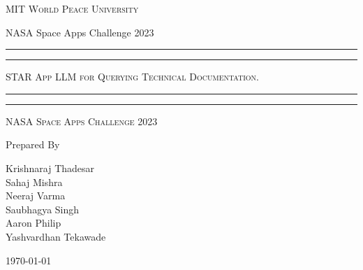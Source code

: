 \documentclass[11pt]{article}
\begin{document}
\begin{titlepage}
	\centering


	\huge\textsc{
		MIT World Peace University
	}\\

	\vspace{0.75\baselineskip} %

	\LARGE{
		NASA Space Apps Challenge 2023
	}

	\vfill %


	\rule{\textwidth}{1.6pt}\vspace*{-\baselineskip}\vspace*{2pt}
	\rule{\textwidth}{0.6pt}
	\vspace{0.75\baselineskip} %



	\huge{\textsc{
			STAR App LLM for Querying Technical Documentation.
		}} \\


	\vspace{0.5\baselineskip} %
	\rule{\textwidth}{0.6pt}\vspace*{-\baselineskip}\vspace*{2.8pt}
	\rule{\textwidth}{1.6pt}

	\vspace{1\baselineskip} %


	\LARGE\textsc{
		NASA Space Apps Challenge 2023
	} %
	\vfill


	Prepared By
	\vspace{0.5\baselineskip} %

	\Large{
		Krishnaraj Thadesar \\
		Sahaj Mishra \\
		Neeraj Varma  \\
		Saubhagya Singh \\
		Aaron Philip \\
		Yashvardhan Tekawade \\
	}


	\vspace{0.5\baselineskip} %
	\today

\end{titlepage}
\end{document}
